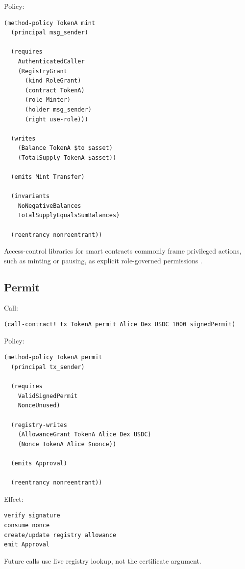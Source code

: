 Policy:

\begin{lstlisting}
(method-policy TokenA mint
  (principal msg_sender)

  (requires
    AuthenticatedCaller
    (RegistryGrant
      (kind RoleGrant)
      (contract TokenA)
      (role Minter)
      (holder msg_sender)
      (right use-role)))

  (writes
    (Balance TokenA $to $asset)
    (TotalSupply TokenA $asset))

  (emits Mint Transfer)

  (invariants
    NoNegativeBalances
    TotalSupplyEqualsSumBalances)

  (reentrancy nonreentrant))
\end{lstlisting}

Access-control libraries for smart contracts commonly frame privileged actions, such as minting or pausing, as explicit role-governed permissions \cite{openzeppelin-access}.

\subsection{Permit}

Call:

\begin{lstlisting}
(call-contract! tx TokenA permit Alice Dex USDC 1000 signedPermit)
\end{lstlisting}

Policy:

\begin{lstlisting}
(method-policy TokenA permit
  (principal tx_sender)

  (requires
    ValidSignedPermit
    NonceUnused)

  (registry-writes
    (AllowanceGrant TokenA Alice Dex USDC)
    (Nonce TokenA Alice $nonce))

  (emits Approval)

  (reentrancy nonreentrant))
\end{lstlisting}

Effect:

\begin{lstlisting}
verify signature
consume nonce
create/update registry allowance
emit Approval
\end{lstlisting}

Future  calls use live registry lookup, not the certificate argument.
